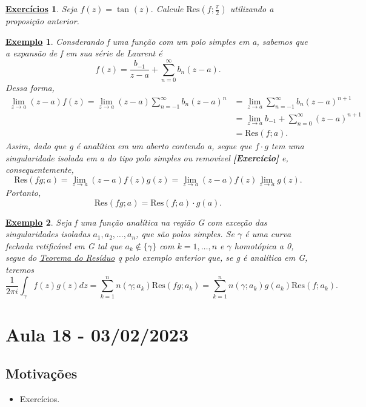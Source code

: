 \documentclass{article}
\newtheorem{example}{\underline{Exemplo}}[section]
\newtheorem*{exer*}{\underline{Exerc\'icios}}
\begin{document}
  \begin{exer*}
    Seja \(f(z) = \tan^{}{(z)}.\) Calcule \(\mathrm{Res}(f; \frac{\pi }{2})\) utilizando a proposição anterior.
  \end{exer*}
  \begin{example}
    Consderando f uma função com um polo simples em a, sabemos que a expansão de f em sua série de Laurent é 
    \[
      f(z) = \frac{b_{-1}}{z-a} + \sum\limits_{n=0}^{\infty}b_{n}(z-a).
    \]
    Dessa forma,
    \begin{align*}
      \lim_{z\to a}(z-a)f(z) = \lim_{z\to a}(z-a)\sum\limits_{n=-1}^{\infty}b_{n}(z-a)^{n} &= \lim_{z\to a}\sum\limits_{n=-1}^{\infty}b_{n}(z-a)^{n+1}\\
                                                                                           &= \lim_{z\to a}b_{-1} + \sum\limits_{n=0}^{\infty}(z-a)^{n+1}\\
                                                                                           &= \mathrm{Res}(f; a).
    \end{align*}
    Assim, dado que g é analítica em um aberto contendo a, segue que \(f \cdot g\) tem uma singularidade isolada em a do tipo polo simples
    ou removível \textbf{[Exercício]} e, consequentemente, 
    \[
      \mathrm{Res}(fg; a) = \lim_{z\to a}(z-a)f(z)g(z) = \lim_{z\to a}(z-a)f(z)\lim_{z\to a}g(z).
    \]
    Portanto, 
    \[
      \mathrm{Res}(fg; a) = \mathrm{Res}(f; a)\cdot g(a).
    \]
  \end{example}
  \begin{example}
    Seja f uma função analítica na região G com exceção das singularidades isoladas \(a_{1}, a_{2}, \dotsc , a_{n}\), que são polos simples.
    Se \(\gamma \) é uma curva fechada retificável em G tal que \(a_{k}\not\in \{\gamma \}\) com \(k=1,\dotsc ,n \) e \(\gamma \) homotópica a 0,
    segue do \hyperlink{residue}{Teorema do Resíduo} q pelo exemplo anterior que, se g é analítica em G, teremos 
    \[
      \frac{1}{2\pi i}\int_{\gamma }^{}f(z)g(z)dz = \sum\limits_{k=1}^{n}n(\gamma ; a_{k})\mathrm{Res}(fg; a_{k}) = \sum\limits_{k=1}^{n}n(\gamma ; a_{k})g(a_{k})\mathrm{Res}(f; a_{k}).
    \]
  \end{example}
  \newpage

  \section{Aula 18 - 03/02/2023}
  \subsection{Motivações} 
  \begin{itemize}
    \item Exercícios.
  \end{itemize}
\end{document}
